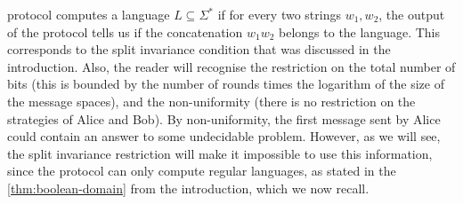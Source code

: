 protocol computes a language $L \subseteq \Sigma^*$ if for every two strings
$w_1,w_2$, the output of the protocol tells us if the concatenation $w_1w_2$
belongs to the language. This corresponds to the split invariance condition
that was discussed in the introduction.  Also, the reader will recognise the
restriction on the total number of bits (this is bounded by the number of
rounds times the logarithm of the size of the message spaces), and the
non-uniformity (there is no restriction on the strategies of Alice and Bob). By
non-uniformity, the first message sent by Alice could contain an answer to some
undecidable problem. However, as we will see, the split invariance restriction
will make it impossible to use this information, since the protocol can only
compute regular languages, as stated in the \cref{thm:boolean-domain} from the
introduction, which we now recall.


\booleandomain*

